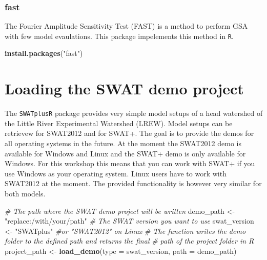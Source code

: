 \documentclass[11pt,]{article}
\newenvironment{Shaded}{\begin{snugshade}}{\end{snugshade}}
\newcommand{\KeywordTok}[1]{\textcolor[rgb]{0.13,0.29,0.53}{\textbf{#1}}}
\newcommand{\DataTypeTok}[1]{\textcolor[rgb]{0.13,0.29,0.53}{#1}}
\newcommand{\StringTok}[1]{\textcolor[rgb]{0.31,0.60,0.02}{#1}}
\newcommand{\CommentTok}[1]{\textcolor[rgb]{0.56,0.35,0.01}{\textit{#1}}}
\newcommand{\NormalTok}[1]{#1}
\begin{document}
\subsubsection{fast}\label{fast}

The Fourier Amplitude Sensitivity Test (FAST) is a method to perform GSA
with few model evaulations. This package impelements this method in
\texttt{R}.

\begin{Shaded}
\begin{Highlighting}[]
\KeywordTok{install.packages}\NormalTok{(}\StringTok{"fast"}\NormalTok{)}
\end{Highlighting}
\end{Shaded}

\newpage

\section{Loading the SWAT demo
project}\label{loading-the-swat-demo-project}

The \texttt{SWATplusR} package provides very simple model setups of a
head watershed of the Little River Experimental Watershed (LREW). Model
setups can be retrievew for SWAT2012 and for SWAT+. The goal is to
provide the demos for all operating systems in the future. At the moment
the SWAT2012 demo is available for Windows and Linux and the SWAT+ demo
is only available for Windows. For this workshop this means that you can
work with SWAT+ if you use Windows as your operating system. Linux users
have to work with SWAT2012 at the moment. The provided functionality is
however very similar for both models.

\begin{Shaded}
\begin{Highlighting}[]
\CommentTok{# The path where the SWAT demo project will be written}
\NormalTok{demo_path <-}\StringTok{ "replace:/with/your/path"}
\CommentTok{# The SWAT version you want to use}
\NormalTok{swat_version <-}\StringTok{ "SWATplus"} \CommentTok{#or "SWAT2012" on Linux}
\CommentTok{# The function writes the demo folder to the defined path and returns the final}
\CommentTok{# path of the project folder in R}
\NormalTok{project_path <-}\StringTok{ }\KeywordTok{load_demo}\NormalTok{(}\DataTypeTok{type =}\NormalTok{ swat_version, }\DataTypeTok{path =}\NormalTok{ demo_path)}
\end{Highlighting}
\end{Shaded}
\newpage
\singlespacing
\end{document}
